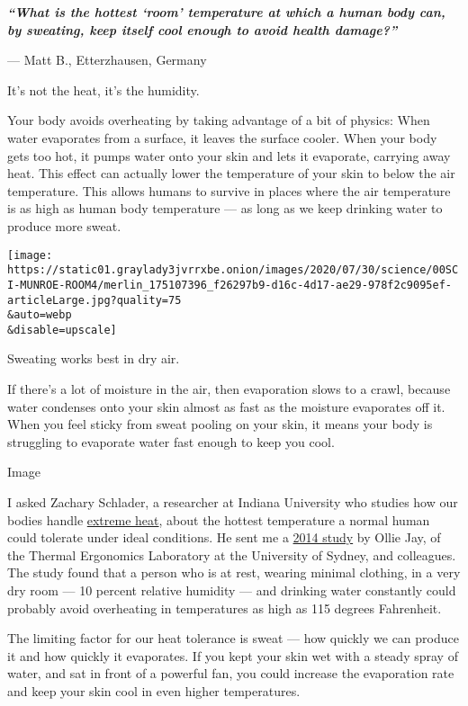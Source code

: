 \emph{\textbf{``What is the hottest `room' temperature at which a human
body can, by sweating, keep itself cool enough to avoid health
damage?''}}

--- Matt B., Etterzhausen, Germany

It's not the heat, it's the humidity.

Your body avoids overheating by taking advantage of a bit of physics:
When water evaporates from a surface, it leaves the surface cooler. When
your body gets too hot, it pumps water onto your skin and lets it
evaporate, carrying away heat. This effect can actually lower the
temperature of your skin to below the air temperature. This allows
humans to survive in places where the air temperature is as high as
human body temperature --- as long as we keep drinking water to produce
more sweat.

\texttt{[image: https://static01.graylady3jvrrxbe.onion/images/2020/07/30/science/00SCI-MUNROE-ROOM4/merlin\_175107396\_f26297b9-d16c-4d17-ae29-978f2c9095ef-articleLarge.jpg?quality=75\\\&auto=webp\\\&disable=upscale]}

Sweating works best in dry air.

If there's a lot of moisture in the air, then evaporation slows to a
crawl, because water condenses onto your skin almost as fast as the
moisture evaporates off it. When you feel sticky from sweat pooling on
your skin, it means your body is struggling to evaporate water fast
enough to keep you cool.

Image

I asked Zachary Schlader, a researcher at Indiana University who studies
how our bodies handle
\href{https://journals.physiology.org/doi/abs/10.1152/ajpregu.00018.2020}{extreme
heat}, about the hottest temperature a normal human could tolerate under
ideal conditions. He sent me a
\href{https://www.sciencedirect.com/science/article/abs/pii/S0003687014001355}{2014
study} by Ollie Jay, of the Thermal Ergonomics Laboratory at the
University of Sydney, and colleagues. The study found that a person who
is at rest, wearing minimal clothing, in a very dry room --- 10 percent
relative humidity --- and drinking water constantly could probably avoid
overheating in temperatures as high as 115 degrees Fahrenheit.

The limiting factor for our heat tolerance is sweat --- how quickly we
can produce it and how quickly it evaporates. If you kept your skin wet
with a steady spray of water, and sat in front of a powerful fan, you
could increase the evaporation rate and keep your skin cool in even
higher temperatures.

